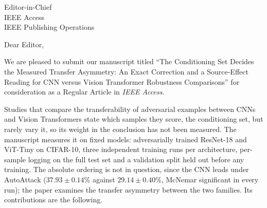 \documentclass[11pt]{letter}
\begin{document}
\begin{letter}{
Editor-in-Chief\\
IEEE Access\\
IEEE Publishing Operations
}

\opening{Dear Editor,}

We are pleased to submit our manuscript titled ``The Conditioning Set Decides the Measured Transfer Asymmetry: An Exact Correction and a Source-Effect Reading for CNN versus Vision Transformer Robustness Comparisons'' for consideration as a Regular Article in \textit{IEEE Access}.

Studies that compare the transferability of adversarial examples between CNNs and Vision Transformers state which samples they score, the conditioning set, but rarely vary it, so its weight in the conclusion has not been measured. The manuscript measures it on fixed models: adversarially trained ResNet-18 and ViT-Tiny on CIFAR-10, three independent training runs per architecture, per-sample logging on the full test set and a validation split held out before any training. The absolute ordering is not in question, since the CNN leads under AutoAttack ($37.93 \pm 0.14\%$ against $29.14 \pm 0.40\%$, McNemar significant in every run); the paper examines the transfer asymmetry between the two families. Its contributions are the following.


\end{letter}
\end{document}
